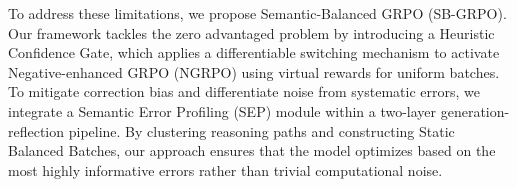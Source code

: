 To address these limitations, we propose Semantic-Balanced GRPO (SB-GRPO). Our framework tackles the zero advantaged problem by introducing a Heuristic Confidence Gate, which applies a differentiable switching mechanism to activate Negative-enhanced GRPO (NGRPO) \cite{ngrpo} using virtual rewards for uniform batches. To mitigate correction bias and differentiate noise from systematic errors, we integrate a Semantic Error Profiling (SEP) module within a two-layer generation-reflection pipeline. By clustering reasoning paths and constructing Static Balanced Batches, our approach ensures that the model optimizes based on the most highly informative errors rather than trivial computational noise.



